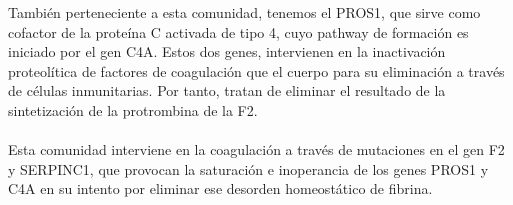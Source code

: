 También perteneciente a esta comunidad, tenemos el PROS1, que sirve como cofactor de la proteína C activada de tipo 4, cuyo pathway de formación es iniciado por el gen C4A. Estos dos genes, intervienen en la inactivación proteolítica de factores de coagulación que el cuerpo para su eliminación a través de células inmunitarias. Por tanto, tratan de eliminar el resultado de la sintetización de la protrombina de la F2.\\\\ Esta comunidad interviene en la coagulación a través de mutaciones en el gen F2 y SERPINC1, que provocan la saturación e inoperancia de los genes PROS1 y C4A en su intento por eliminar ese desorden homeostático de fibrina. 


